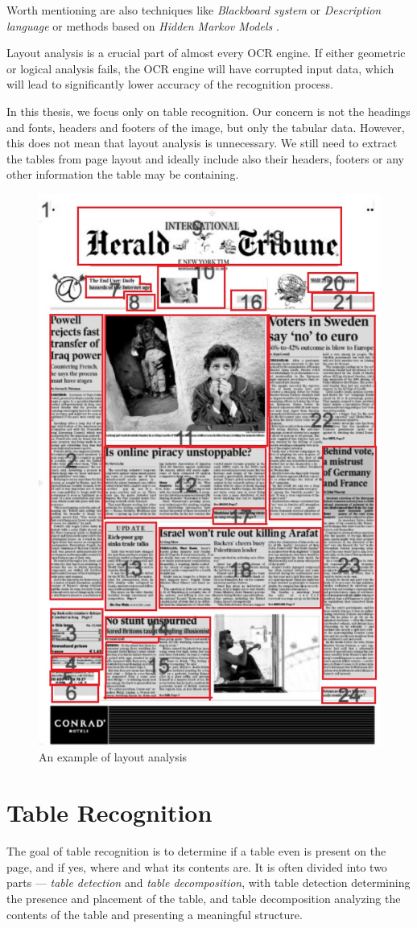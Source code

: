 Worth mentioning are also techniques like \emph{Blackboard system} or \emph{Description language} or methods based on \emph{Hidden Markov Models} \cite{logicalLayoutOther}.

Layout analysis is a crucial part of almost every OCR engine. If either geometric or logical analysis fails, the OCR engine will have corrupted input data, which will lead to significantly lower accuracy of the recognition process. 

In this thesis, we focus only on table recognition. Our concern is not the headings and fonts, headers and footers of the image, but only the tabular data. However, this does not mean that layout analysis is unnecessary. We still need to extract the tables from page layout and ideally include also their headers, footers or any other information the table may be containing.

\begin{figure}[H]
\centering
\includegraphics[width=0.5\linewidth]{img/tableDetection/readingOrder.jpg}
\caption{An example of layout analysis \citep{hadjar2004xed}} \label{fig:1a}
\end{figure}

\section{Table Recognition}

The goal of table recognition is to determine if a table even is present on the page, and if yes, where and what its contents are. It is often divided into two parts --- \emph{table detection} and \emph{table decomposition}, with table detection determining the presence and placement of the table, and table decomposition analyzing the contents of the table and presenting a meaningful structure.

